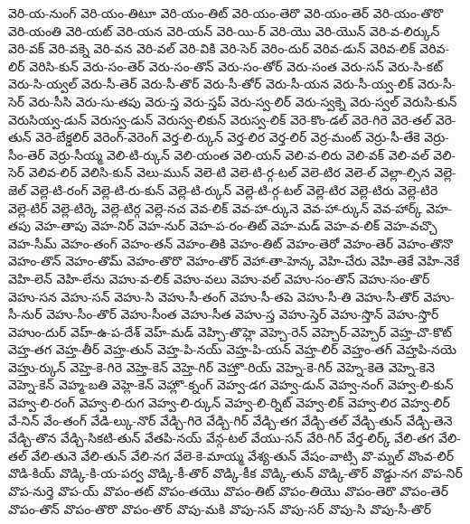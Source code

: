 {వెరి-య-నుంగ్
వెరి-యం-తిటూ
వెరి-యం-తిట్
వెరి-యం-తెరొ
వెరి-యం-తెర్
వెరి-యం-తొరొ
వెరి-యంతి
వెరి-యట్
వెరి-యన
వెరి-యన్
వెరి-యి-ర్
వెరి-యొ
వెరి-యొన్
వెరి-వ-లిర్కున్
వెరి-వక్
వెరి-వక్నె
వెరి-వన
వెరి-వల్
వెరి-వికి
వెరి-సెర్
వెరిం-దుర్
వెరివ-డున్
వెరివ-లిక్
వెరివ-లిర్
వెరిసి-కున్
వెరు-సం-తెర్
వెరు-సం-తొన్
వెరు-సం-తోర్
వెరు-సంత
వెరు-సన్
వెరు-సి-కట్
వెరు-సి-య్వల్
వెరు-సీ-తెర్
వెరు-సీ-తొర్
వెరు-సీ-తోర్
వెరు-సీ-యన
వెరు-సీ-య్వ-లిక్
వెరు-సీ-సెర్
వెరు-సీసి
వెరు-సు-తపు
వెరు-స్త
వెరు-స్తప్
వెరు-స్వ-లిర్
వెరు-స్వక్నె
వెరు-స్వల్
వెరుసి-కున్
వెరుసియ్వ-డున్
వెరుస్వ-డున్
వెరుస్వ-లికున్
వెరుస్వ-లిక్
వెరె-కొం-డల్
వెరె-గిరె
వెరె-తల్
వెరె-తున్
వెరె-బేక్డలిర్
వెరెంగ్-వెరెంగ్
వెర్త-లి-ర్కున్
వెర్త-లిర
వెర్త-లిర్
వెర్ర-మంట్
వెర్రు-సీ-తేకె
వెర్రు-సీం-తెర్
వెర్రు-సీయ్మ
వెలి-టి-ర్కున్
వెలి-యంత
వెలి-యన్
వెలి-వ-లిరు
వెలి-వక్
వెలి-వల్
వెలి-సెర్
వెలివ-లిర్
వెలిసి-కున్
వెలు-మున్
వెలె-టి
వెలె-టి-ర్గ-టల్
వెలె-టిర
వెలె-ల్
వెల్లా-ల్సిన
వెల్లె-జెల్
వెల్లె-టి-రంగ్
వెల్లె-టి-రు-కున్
వెల్లె-టి-ర్కున్
వెల్లె-టి-ర్గ-టల్
వెల్లె-టిర
వెల్లె-టిరు
వెల్లె-టిరె
వెల్లె-టిర్
వెల్లె-టిర్కె
వెల్లె-టిర్గ
వెల్లె-నచ
వెవ-లిక్
వెవ-హా-ర్కునె
వెవ-హా-ర్కున్
వెవ-హార్క్
వెహ-తపు
వెహ-తాపు
వెహ-నిర్
వెహ-నుర్
వెహ-ప-రం-తిట్
వెహ-మడ్
వెహ-వ-లిక్
వెహ-వచ్చొ
వెహ-సీమ్
వెహం-తంగ్
వెహం-తన్
వెహం-తికి
వెహం-తిట్
వెహం-తెరో
వెహం-తెర్
వెహం-తొనొ
వెహం-తొన్
వెహం-తొమ్
వెహం-తొరొ
వెహం-తొర్
వెహా-తా-హెన్క
వెహి-చేరు
వెహి-తెకే
వెహి-నెకే
వెహి-లెన్
వెహి-లేను
వెహు-వ-లిక్
వెహు-వలు
వెహు-వల్
వెహు-సం-తొన్
వెహు-సం-తొర్
వెహు-సన
వెహు-సన్
వెహు-సి
వెహు-సీ-తంగ్
వెహు-సీ-తపె
వెహు-సీ-తి
వెహు-సీ-తొర్
వెహు-సీ-నుర్
వెహు-సీం-తొర్
వెహు-సీంత
వెహు-సీత
వెహు-స్త
వెహు-స్తెర్
వెహు-స్తొన్
వెహు-స్తొర్
వెహుం-దుర్
వెహ్-ఉ-ప-దేశ్
వెహ్-మడ్
వెహ్చి-తొహ్లె
వెహ్చె-రెన్
వెహ్చెర్-వెహ్చెర్
వెహ్త-చొ-కొట్
వెహ్త-తగ
వెహ్త-తీర్
వెహ్త-తున్
వెహ్త-పి-నయ్
వెహ్త-పి-యన్
వెహ్త-లిర్
వెహ్తం-తగ్
వెహ్తపి-నయె
వెహ్తు-ర్కున్
వెహ్తె-కె-గిరె
వెహ్తె-కెన్
వెహ్తె-గిర్
వెహ్తొ-రియ్
వెహ్నె-కె-గిర్
వెహ్నె-కెతె
వెహ్నె-కెనె
వెహ్నె-కెన్
వెహ్మ-బతి
వెహ్లె-కెన్
వెహ్లొ-క్నంగ్
వెహ్వ-డగ
వెహ్వ-డున్
వెహ్వ-నంగ్
వెహ్వ-లి-కున్
వెహ్వ-లి-రంగ్
వెహ్వ-లి-రుగ
వెహ్వ-లి-ర్కున్
వెహ్వ-లి-ర్నిట్
వెహ్వ-లిక్
వెహ్వ-లిర
వెహ్వ-లిర్
వే-నిన్
వేం-తంగ్
వేడి-ల్కు-నొర్
వేడ్చి-గిరె
వేడ్చి-గిర్
వేడ్చి-తగ
వేడ్చి-తల్
వేడ్చి-తున్
వేడ్చి-తెనె
వేడ్చి-తొన
వేడ్చి-సికటి-తున్
వేతపి-నయ్
వేన్గ-టల్
వేయు-సన్
వేరి-గిర్
వేర్త-లిర్క్
వేలి-తగ
వేలి-తల్
వేలి-తునె
వేలి-తున్
వేలి-నగ
వేలె-కె-మాయ్మ
వేశ్య-తున్
వేషం-వాట్సి
వొ-మ్నల్
వొంవ-లిర్
వొడి-కియ్
వొడ్కి-కి-య-పర్వ
వొడ్కి-కీ-తొర్
వొడ్కి-కీక
వొడ్కి-తున్
వొడ్కి-తొర్
వొడ్డు-నగ
వొప-నిర్
వొప-నుర్తె
వొప-య్
వొపం-తట్
వొపం-తయొ
వొపం-తిట్
వొపం-తియొ
వొపం-తెరొ
వొపం-తెర్
వొపం-తొన్
వొపం-తొరొ
వొపం-తొర్
వొపు-మకి
వొపు-సన్
వొపు-సర్
వొపు-సి
వొపు-సీ-తొర్
}
